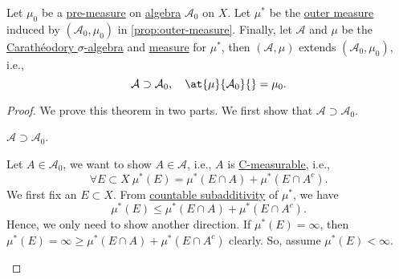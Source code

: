 \begin{theorem}\label{thm:Hahn-Kolmogorov}
	Let \(\mu_0\) be a \hyperref[def:pre-measure]{pre-measure} on \hyperref[def:algebra]{algebra} \(\mathcal{A} _0\) on \(X\). Let \(\mu^{\ast} \) be the \hyperref[def:outer-measure]{outer measure} induced by \((\mathcal{A} _0, \mu_0)\) in \autoref{prop:outer-measure}. Finally, let \(\mathcal{A}\) and \(\mu\) be the \hyperref[thm:Caratheodory-extension]{Carathéodory \(\sigma\)-algebra} and \hyperref[def:measure]{measure} for \(\mu^{\ast} \), then
	\((\mathcal{A} , \mu)\) extends \((\mathcal{A} _0, \mu_0)\), i.e.,
	\[
		\mathcal{A} \supset \mathcal{A} _0,\quad \at{\mu}{\mathcal{A}_0 }{} = \mu_0.
	\]
\end{theorem}
\begin{proof}\let\qed\relax
	We prove this theorem in two parts. We first show that \(\mathcal{A} \supset \mathcal{A} _0\).
	\begin{claim}
		\(\mathcal{A} \supset \mathcal{A} _0\).
	\end{claim}
	\begin{explanation}
		Let \(A\in \mathcal{A} _0\), we want to show \(A\in \mathcal{A} \), i.e., \(A\) is \hyperref[def:C-measurable]{C-measurable}, i.e.,
		\[
			\forall E\subset X\ \mu^{\ast} (E) = \mu^{\ast} (E\cap A) + \mu^{\ast} (E\cap A^{c}).
		\]
		We first fix an \(E\subset X\). From \hyperref[def:outer-measure-countable-subadditivity]{countable subadditivity} of \(\mu^{\ast} \), we have
		\[
			\mu^{\ast} (E) \leq \mu^{\ast} (E\cap A) + \mu^{\ast} (E\cap A^{c} ).
		\]
		Hence, we only need to show another direction. If \(\mu^{\ast} (E) = \infty \), then \(\mu^{\ast} (E) = \infty \geq \mu^{\ast} (E\cap A) + \mu^{\ast} (E\cap A^{c} )\) clearly. So, assume \(\mu^{\ast} (E)<\infty \).


\end{explanation}
\end{proof}
